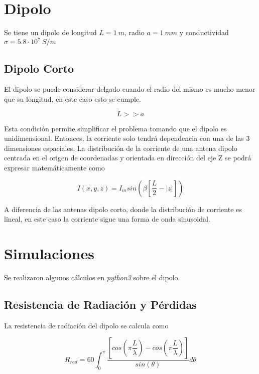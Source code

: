 \documentclass{article}
\begin{document}


\section{Dipolo}
Se tiene un dipolo de longitud $L=1\:m$, radio $a=1\:mm$ y conductividad $\sigma = 5.8 \cdot 10^{7}\: S/m$
\subsection{Dipolo Corto}

El dipolo se puede considerar delgado cuando el radio del mismo es mucho menor que su longitud, en este caso esto se cumple.

\begin{equation}
    L >> a
\end{equation}

Esta condición permite simplificar el problema tomando que el dipolo es unidimensional. Entonces, la corriente solo tendrá dependencia con una de las 3 dimensiones espaciales. La distribución de la corriente de una antena dipolo centrada en el origen de coordenadas y orientada en dirección del eje Z se podrá expresar matemáticamente como

\begin{equation}
    I(x, y, z) = I_{m} sin\left(\beta \left[\dfrac{L}{2} - |z| \right]\right)
\end{equation}

A diferencia de las antenas dipolo corto, donde la distribución de corriente es lineal, en este caso la corriente sigue una forma de onda sinusoidal.

\section{Simulaciones}

Se realizaron algunos cálculos en \textit{python3} sobre el dipolo.

\subsection{Resistencia de Radiación y Pérdidas}

La resistencia de radiación del dipolo se calcula como

\begin{equation}
    R_{rad} = 60 \int_{0}^{\pi} \dfrac{
    \left[ 
        cos\left( 
            \pi \dfrac{L}{\lambda} 
        \right) 
        - cos\left(
            \pi \dfrac{L}{\lambda}
        \right)
    \right]}{sin(\theta)} d\theta 
\end{equation}
\end{document}
